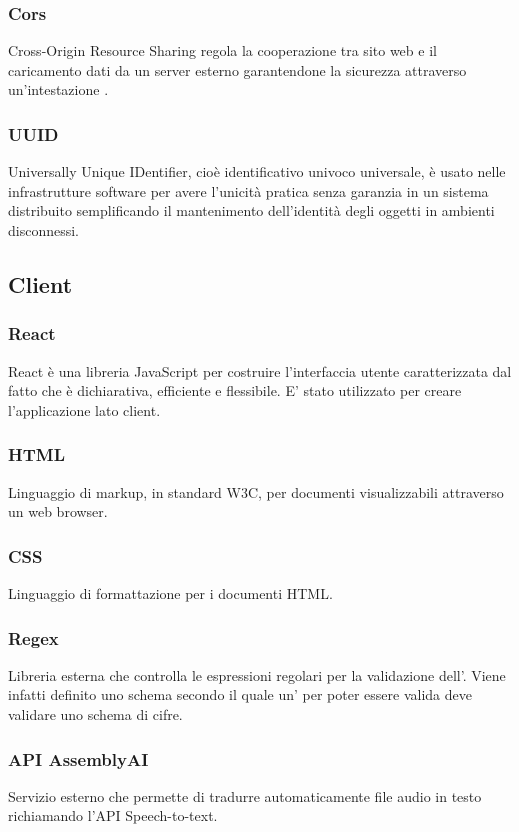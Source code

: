 \subsubsection{Cors}
Cross-Origin Resource Sharing regola la cooperazione tra sito web e il caricamento dati da un server esterno garantendone la sicurezza attraverso un'intestazione .
\subsubsection{UUID}
Universally Unique IDentifier, cioè identificativo univoco universale, è usato nelle infrastrutture software per avere l'unicità pratica senza garanzia in un sistema distribuito semplificando il mantenimento dell'identità degli oggetti in ambienti disconnessi.
\subsection{Client}
\subsubsection{React}
React è una libreria JavaScript per costruire l'interfaccia utente caratterizzata dal fatto che è dichiarativa, efficiente e flessibile. E' stato utilizzato per creare l'applicazione lato client.
\subsubsection{HTML}
Linguaggio di markup, in standard W3C, per documenti visualizzabili attraverso un web browser.
\subsubsection{CSS}
Linguaggio di formattazione per i documenti HTML.
\subsubsection{Regex}
Libreria esterna che controlla le espressioni regolari per la validazione dell'. Viene infatti definito uno schema secondo il quale un' per poter essere valida deve validare uno schema di cifre. 
\subsubsection{API AssemblyAI}
Servizio esterno che permette di tradurre automaticamente file audio in testo richiamando l'API Speech-to-text. 
\newpage